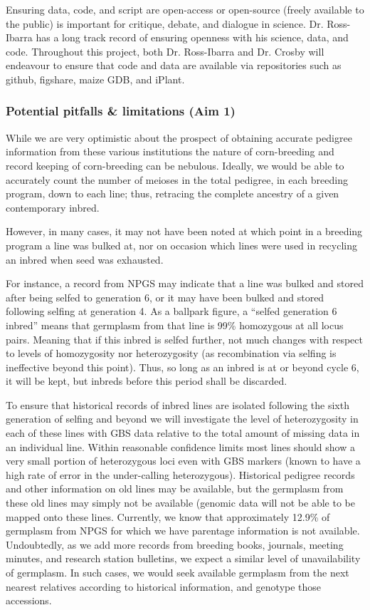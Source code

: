 \documentclass[draft,12pt]{article}
\begin{document}
Ensuring data, code, and script are open-access or open-source (freely available to the public) is important for critique, debate, and dialogue in science. Dr. Ross-Ibarra has a long track record of ensuring openness with his science, data, and code. Throughout this project, both Dr. Ross-Ibarra and Dr. Crosby will endeavour to ensure that code and data are available via repositories such as github, figshare, maize GDB, and iPlant.



\subsubsection*{Potential pitfalls \& limitations (Aim 1)}
While we are very optimistic about the prospect of obtaining accurate pedigree information from these various institutions the nature of corn-breeding and record keeping of corn-breeding can be nebulous. 
Ideally, we would be able to accurately count the number of meioses in the total pedigree, in each breeding program, down to each line; thus, retracing the complete ancestry of a given contemporary inbred. 

However, in many cases, it may not have been noted at which point in a breeding program a line was bulked at, nor on occasion which lines were used in recycling an inbred when seed was exhausted. 

For instance, a record from NPGS may indicate that a line was bulked and stored after being selfed to generation 6, or it may have been bulked and stored following selfing at generation 4. As a ballpark figure, a ``selfed generation 6 inbred'' means that germplasm from that line is 99\% homozygous at all locus pairs. 
Meaning that if this inbred is selfed further, not much changes with respect to levels of homozygosity nor heterozygosity (as recombination via selfing is ineffective beyond this point).  
Thus, so long as an inbred is at or beyond cycle 6, it will be kept, but inbreds before this period shall be discarded.

To ensure that historical records of inbred lines are isolated following the sixth generation of selfing and beyond we will investigate the level of heterozygosity in each of these lines with GBS data relative to the total amount of missing data in an individual line. 
Within reasonable confidence limits most lines should show a very small portion of heterozygous loci even with GBS markers (known to have a high rate of error in the under-calling heterozygous). 
Historical pedigree records and other information on old lines may be available, but the germplasm from these old lines may simply not be available (genomic data will not be able to be mapped onto these lines. 
Currently, we know that approximately 12.9\% of germplasm from NPGS for which we have parentage information is not available. 
Undoubtedly, as we add more records from breeding books, journals, meeting minutes, and research station bulletins, we expect a similar level of unavailability of germplasm.  
In such cases, we would seek available germplasm from the next nearest relatives according to historical information, and genotype those accessions. 
\end{document}
